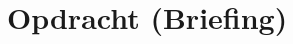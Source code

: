 
    \pagestyle{plain} %









    \pagestyle{scrheadings} %


    \cleardoublepage


    \cleardoublepage %


   

    \part{Opdracht (Briefing)}\label{prt:opdracht}
    
    
    

